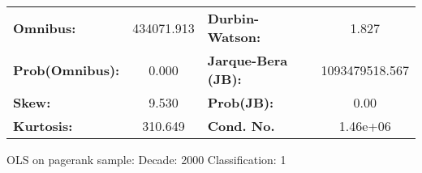 \begin{center}
\begin{tabular}{lccccc}
\bottomrule
\end{tabular}
\begin{tabular}{lclc}
\textbf{Omnibus:}       & 434071.913 & \textbf{  Durbin-Watson:     } &       1.827     \\
\textbf{Prob(Omnibus):} &    0.000   & \textbf{  Jarque-Bera (JB):  } & 1093479518.567  \\
\textbf{Skew:}          &    9.530   & \textbf{  Prob(JB):          } &        0.00     \\
\textbf{Kurtosis:}      &  310.649   & \textbf{  Cond. No.          } &    1.46e+06     \\
\bottomrule
\end{tabular}
\end{center}
\break
OLS on pagerank sample: Decade: 2000 Classification: 1
